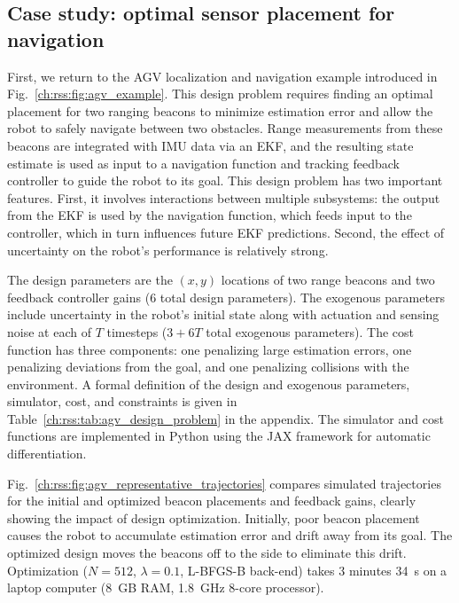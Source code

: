 \subsection{Case study: optimal sensor placement for navigation}\label{ch:rss:case1}

First, we return to the AGV localization and navigation example introduced in Fig.~\ref{ch:rss:fig:agv_example}. This design problem requires finding an optimal placement for two ranging beacons to minimize estimation error and allow the robot to safely navigate between two obstacles. Range measurements from these beacons are integrated with IMU data via an EKF, and the resulting state estimate is used as input to a navigation function and tracking feedback controller to guide the robot to its goal. This design problem has two important features. First, it involves interactions between multiple subsystems: the output from the EKF is used by the navigation function, which feeds input to the controller, which in turn influences future EKF predictions. Second, the effect of uncertainty on the robot's performance is relatively strong.

The design parameters are the $(x, y)$ locations of two range beacons and two feedback controller gains (6 total design parameters). The exogenous parameters include uncertainty in the robot's initial state along with actuation and sensing noise at each of $T$ timesteps ($3 + 6T$ total exogenous parameters). The cost function has three components: one penalizing large estimation errors, one penalizing deviations from the goal, and one penalizing collisions with the environment. A formal definition of the design and exogenous parameters, simulator, cost, and constraints is given in Table~\ref{ch:rss:tab:agv_design_problem} in the appendix. The simulator and cost functions are implemented in Python using the JAX framework for automatic differentiation.

Fig.~\ref{ch:rss:fig:agv_representative_trajectories} compares simulated trajectories for the initial and optimized beacon placements and feedback gains, clearly showing the impact of design optimization. Initially, poor beacon placement causes the robot to accumulate estimation error and drift away from its goal. The optimized design moves the beacons off to the side to eliminate this drift. Optimization ($N=512$, $\lambda=0.1$, L-BFGS-B back-end) takes 3 minutes \SI{34}{s} on a laptop computer (\SI{8}{GB} RAM, \SI{1.8}{GHz} 8-core processor).

